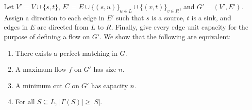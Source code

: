 \documentclass[11pt]{article}
\begin{document}
Let $V' = V \cup \{s, t\}$, $E' = E \cup \{(s, u)\}_{u \in L} \cup \{(v, t)\}_{v \in R}$, and $G' = {(V', E')}$.
Assign a direction to each edge in $E'$ such that $s$ is a source, $t$ is a sink, and edges in $E$ are directed from $L$ to $R$.
Finally, give every edge unit capacity for the purpose of defining a flow on $G'$.
We show that the following are equivalent:

\begin{enumerate}
  \item There exists a perfect matching in $G$.
  \item A maximum flow $f$ on $G'$ has size $n$.
  \item A minimum cut $C$ on $G'$ has capacity $n$.
  \item For all $S \subseteq L$, $|\Gamma(S)| \geq |S|$.
\end{enumerate}
\end{document}
